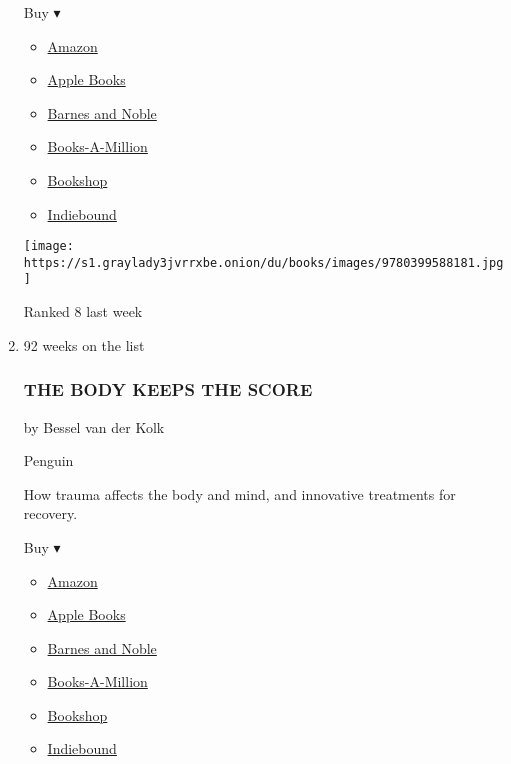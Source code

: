 \begin{enumerate}
  Buy ▾

  \begin{itemize}
  \tightlist
  \item
    \href{https://www.amazon.com/Born-Crime-Stories-African-Childhood-ebook/dp/B01DHWACVY?tag=NYTBS-20}{Amazon}
  \item
    \href{https://du-gae-books-dot-nyt-du-prd.appspot.com/buy?title=BORN+A+CRIME\&author=Trevor+Noah}{Apple
    Books}
  \item
    \href{https://www.anrdoezrs.net/click-7990613-11819508?url=https\%3A\%2F\%2Fwww.barnesandnoble.com\%2Fw\%2F\%3Fean\%3D9780399588198}{Barnes
    and Noble}
  \item
    \href{https://www.anrdoezrs.net/click-7990613-35140?url=https\%3A\%2F\%2Fwww.booksamillion.com\%2Fp\%2FBORN\%2BA\%2BCRIME\%2FTrevor\%2BNoah\%2F9780399588198}{Books-A-Million}
  \item
    \href{https://bookshop.org/a/3546/9780399588198}{Bookshop}
  \item
    \href{https://www.indiebound.org/book/9780399588198?aff=NYT}{Indiebound}
  \end{itemize}

  \texttt{[image: https://s1.graylady3jvrrxbe.onion/du/books/images/9780399588181.jpg]}

  Ranked 8 last week
\item
  92 weeks on the list

  \hypertarget{the-body-keeps-the-score}{%
  \subsubsection{THE BODY KEEPS THE
  SCORE}\label{the-body-keeps-the-score}}

  by Bessel van der Kolk

  Penguin

  How trauma affects the body and mind, and innovative treatments for
  recovery.

  Buy ▾

  \begin{itemize}
  \tightlist
  \item
    \href{http://www.amazon.com/The-Body-Keeps-Score-Healing/dp/0670785938?tag=NYTBS-20}{Amazon}
  \item
    \href{https://du-gae-books-dot-nyt-du-prd.appspot.com/buy?title=THE+BODY+KEEPS+THE+SCORE\&author=Bessel+van+der+Kolk}{Apple
    Books}
  \item
    \href{https://www.anrdoezrs.net/click-7990613-11819508?url=https\%3A\%2F\%2Fwww.barnesandnoble.com\%2Fw\%2F\%3Fean\%3D9780143127741}{Barnes
    and Noble}
  \item
    \href{https://www.anrdoezrs.net/click-7990613-35140?url=https\%3A\%2F\%2Fwww.booksamillion.com\%2Fp\%2FTHE\%2BBODY\%2BKEEPS\%2BTHE\%2BSCORE\%2FBessel\%2Bvan\%2Bder\%2BKolk\%2F9780143127741}{Books-A-Million}
  \item
    \href{https://bookshop.org/a/3546/9780143127741}{Bookshop}
  \item
    \href{https://www.indiebound.org/book/9780143127741?aff=NYT}{Indiebound}
  \end{itemize}


\end{enumerate}
